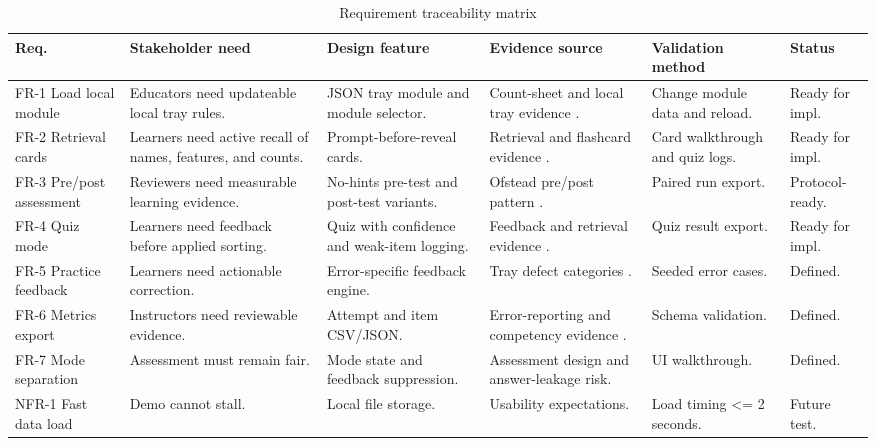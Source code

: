 \documentclass[10pt,a4paper]{article}
\begin{document}
\begin{table}[H]
\centering
\caption{Requirement traceability matrix}
\label{tab:requirement-traceability-matrix}
\small\renewcommand{\arraystretch}{1.15}\setlength{\tabcolsep}{3pt}
\begin{tabularx}{\textwidth}{|>{\raggedright\arraybackslash}p{1.5cm}|>{\raggedright\arraybackslash}X|>{\raggedright\arraybackslash}X|>{\raggedright\arraybackslash}p{2.5cm}|>{\raggedright\arraybackslash}p{2.3cm}|>{\raggedright\arraybackslash}p{1.7cm}|}
\hline
Req. & Stakeholder need & Design feature & Evidence source & Validation method & Status \\
\hline
FR-1 Load local module & Educators need updateable local tray rules. & JSON tray module and module selector. & Count-sheet and local tray evidence \cite{nadeau-2024}. & Change module data and reload. & Ready for impl. \\
\hline
FR-2 Retrieval cards & Learners need active recall of names, features, and counts. & Prompt-before-reveal cards. & Retrieval and flashcard evidence \cite{roediger-and-karpicke-2006, barrison-et-al-2025}. & Card walkthrough and quiz logs. & Ready for impl. \\
\hline
FR-3 Pre/post assessment & Reviewers need measurable learning evidence. & No-hints pre-test and post-test variants. & Ofstead pre/post pattern \cite{ofstead-et-al-2023}. & Paired run export. & Protocol-ready. \\
\hline
FR-4 Quiz mode & Learners need feedback before applied sorting. & Quiz with confidence and weak-item logging. & Feedback and retrieval evidence \cite{hattie-and-timperley-2007}. & Quiz result export. & Ready for impl. \\
\hline
FR-5 Practice feedback & Learners need actionable correction. & Error-specific feedback engine. & Tray defect categories \cite{alfred-et-al-2021, nichol-et-al-2024}. & Seeded error cases. & Defined. \\
\hline
FR-6 Metrics export & Instructors need reviewable evidence. & Attempt and item CSV/JSON. & Error-reporting and competency evidence \cite{nichol-et-al-2024, ofstead-et-al-2023}. & Schema validation. & Defined. \\
\hline
FR-7 Mode separation & Assessment must remain fair. & Mode state and feedback suppression. & Assessment design and answer-leakage risk. & UI walkthrough. & Defined. \\
\hline
NFR-1 Fast data load & Demo cannot stall. & Local file storage. & Usability expectations. & Load timing <= 2 seconds. & Future test. \\

\end{tabularx}
\end{table}
\end{document}
